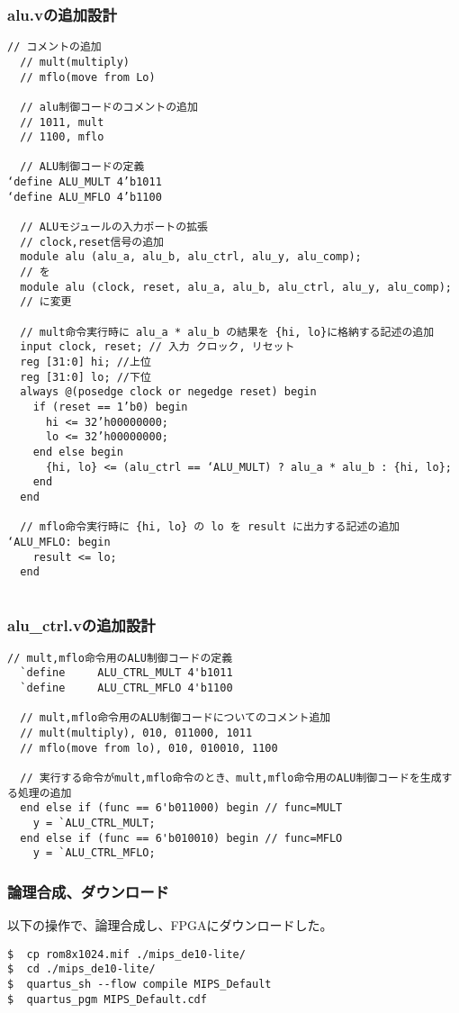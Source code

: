 \subsubsection{alu.vの追加設計}
\begin{lstlisting}[caption={alu.vの変更},label={alu.vの変更9}]
  // コメントの追加
  // mult(multiply)
  // mflo(move from Lo)
  
  // alu制御コードのコメントの追加
  // 1011, mult
  // 1100, mflo
  
  // ALU制御コードの定義
‘define ALU_MULT 4’b1011
‘define ALU_MFLO 4’b1100
  
  // ALUモジュールの入力ポートの拡張
  // clock,reset信号の追加
  module alu (alu_a, alu_b, alu_ctrl, alu_y, alu_comp);
  // を
  module alu (clock, reset, alu_a, alu_b, alu_ctrl, alu_y, alu_comp);
  // に変更
  
  // mult命令実行時に alu_a * alu_b の結果を {hi, lo}に格納する記述の追加
  input clock, reset; // 入力 クロック, リセット
  reg [31:0] hi; //上位
  reg [31:0] lo; //下位
  always @(posedge clock or negedge reset) begin
    if (reset == 1’b0) begin
      hi <= 32’h00000000;
      lo <= 32’h00000000;
    end else begin
      {hi, lo} <= (alu_ctrl == ‘ALU_MULT) ? alu_a * alu_b : {hi, lo};
    end
  end
  
  // mflo命令実行時に {hi, lo} の lo を result に出力する記述の追加
‘ALU_MFLO: begin
    result <= lo;
  end
  
\end{lstlisting}

\subsubsection{alu\_ctrl.vの追加設計}
\begin{lstlisting}[caption={alu\_ctrl.v},label={aluctrl.v9}]
  // mult,mflo命令用のALU制御コードの定義
  `define     ALU_CTRL_MULT 4'b1011
  `define     ALU_CTRL_MFLO 4'b1100
  
  // mult,mflo命令用のALU制御コードについてのコメント追加
  // mult(multiply), 010, 011000, 1011
  // mflo(move from lo), 010, 010010, 1100
  
  // 実行する命令がmult,mflo命令のとき、mult,mflo命令用のALU制御コードを生成する処理の追加
  end else if (func == 6'b011000) begin // func=MULT
    y = `ALU_CTRL_MULT;
  end else if (func == 6'b010010) begin // func=MFLO
    y = `ALU_CTRL_MFLO;
\end{lstlisting}

\subsubsection{論理合成、ダウンロード}
以下の操作で、論理合成し、FPGAにダウンロードした。
\begin{lstlisting}[caption={論理合成、ダウンロード},label={論理合成、ダウンロード9}]
$  cp rom8x1024.mif ./mips_de10-lite/
$  cd ./mips_de10-lite/
$  quartus_sh --flow compile MIPS_Default
$  quartus_pgm MIPS_Default.cdf
\end{lstlisting}

